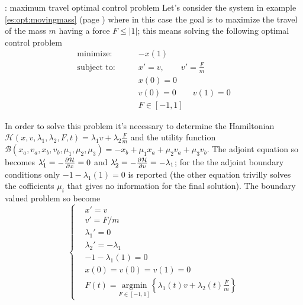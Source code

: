 \begin{example}{: maximum travel optimal control problem}
	Let's consider the system in example \ref{es:opt:movingmass} (page \pageref{es:opt:movingmass}) where in this case the goal is to maximize the travel of the mass $m$ having a force $F \leq |1|$; this means solving the following optimal control problem
	\begin{align*}
		\textrm{minimize:} \qquad & -x(1) \\
		\textrm{subject to:} \qquad & x' = v, \qquad v' = \frac F m \\
		& x(0) = 0  \\ & v(0) = 0 \qquad v(1) = 0 \\
		& F \in [-1,1]
	\end{align*}
	
	In order to solve this problem it's necessary to determine the Hamiltonian $\mathcal H(x,v,\lambda_1,\lambda_2, F,t) = \lambda_1 v + \lambda_2 \frac F m$ and the  utility function $\mathcal B(x_a,v_a,x_b,v_b,\mu_1,\mu_2,\mu_3) = -x_b + \mu_1 x_a + \mu_2 v_a + \mu_3 v_b$. The adjoint equation so becomes $\lambda_1' = - \frac{\partial \mathcal H}{\partial x} = 0$ and $\lambda_2' = - \frac{\partial \mathcal H}{\partial v} = - \lambda_1$; for the the adjoint boundary conditions only $-1 - \lambda_1(1)=0$ is reported (the other equation trivilly solves the cofficients $\mu_i$ that gives no information for the final solution). The boundary valued problem so become
	\[ \left\{ \begin{aligned}
		& x' = v \\ & v' = F/m \\ & \lambda_1' = 0 \\ & \lambda_2' = - \lambda_1 \\
		& -1-\lambda_1(1)= 0\\
		& x(0) = v(0) = v(1) = 0 \\
		& F(t) = \underset{\overline F \in [-1,1]}{\textrm{argmin}} \left\{ \lambda_1(t) v + \lambda_2(t) \frac {\overline F}m \right\}
	\end{aligned} \right.  \]
	

\end{example}
